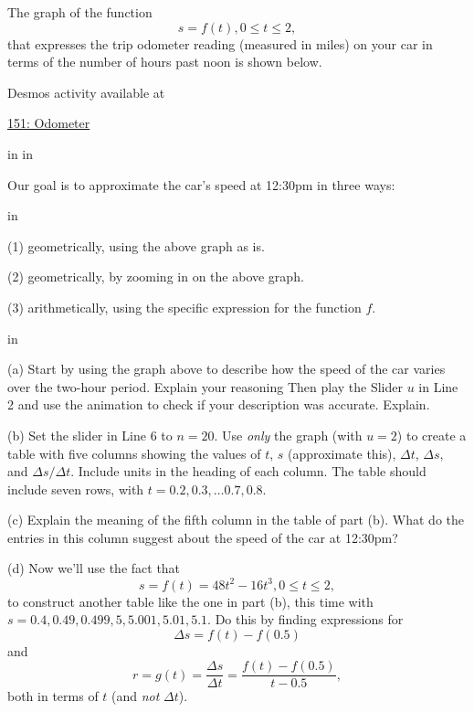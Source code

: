 \documentclass{ximera}
\newcommand{\pskip}{\vskip 0.1 in}
\begin{document}
\begin{example}
The graph of the function
\[
    s = f(t) , 0\leq t \leq 2 ,
\]
that expresses the trip odometer reading (measured in miles) on your car in terms of the number of hours past noon is shown below.

 
\begin{onlineOnly}
    \begin{center}
\end{center}
\end{onlineOnly}

Desmos activity available at

\href{https://www.desmos.com/calculator/pjzklxgypc}{151: Odometer}

\pskip \pskip

Our goal is to approximate the car's speed at 12:30pm in three ways:

\pskip

(1) geometrically, using the above graph as is.

(2) geometrically, by zooming in on the above graph.

(3) arithmetically, using the specific expression for the function $f$.


\pskip

(a) Start by using the graph above to describe how the speed of the car varies over the two-hour period. Explain your reasoning Then play the Slider $u$ in Line 2 and use the animation to check if your description was accurate. Explain.

(b) Set the slider in Line 6 to $n=20$. Use \emph{only} the graph (with $u=2$) to create a table with five columns showing the values of $t$, $s$ (approximate this), $\Delta t$, $\Delta s$, and $\Delta s / \Delta t$. Include units in the heading of each column. The table should include seven rows, with $t=0.2, 0.3, \ldots 0.7, 0.8$. 

(c) Explain the meaning of the fifth column in the table of part (b). What do the entries in this column suggest about the speed of the car at 12:30pm?

(d) Now we'll use the fact that
\[
   s = f(t) = 48t^2 - 16t^3, 0 \leq t \leq 2 ,
\]
to construct another table like the one in part (b), this time with $s=0.4, 0.49, 0.499, 5, 5.001, 5.01, 5.1$. Do this by finding expressions for 
\[
    \Delta s = f(t) - f(0.5)
\]
and
\[
   r = g(t) = \frac{\Delta s}{\Delta t} = \frac{f(t) - f(0.5)}{t-0.5} ,
\]
both in terms of $t$ (and \emph{not} $\Delta t$).



\end{example}
\end{document}
